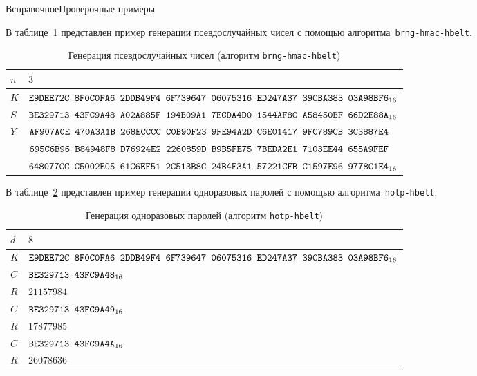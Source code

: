 \begin{appendix}{В}{справочное}{Проверочные примеры}

В таблице~\ref{Table.PRNG-HMAC} представлен пример 
генерации псевдослучайных чисел 
с помощью алгоритма~\texttt{brng-hmac-hbelt}.

\begin{table}[H]
\caption{Генерация псевдослучайных чисел (алгоритм \texttt{brng-hmac-hbelt})}
\label{Table.PRNG-HMAC}
\begin{tabular}{|l|l|}
%
\hline
$n$ & 
$3$\\
%
\hline
$K$ & 
$\texttt{E9DEE72C~8F0C0FA6~2DDB49F4~6F739647~06075316~ED247A37~39CBA383~03A98BF6}_{16}$\\
%
\hline
$S$ & 
$\texttt{BE329713~43FC9A48~A02A885F~194B09A1~7ECDA4D0~1544AF8C~A58450BF~66D2E88A}_{16}$\\
\hline
\hline
$Y$ & 
$\texttt{AF907A0E~470A3A1B~268ECCCC~C0B90F23~9FE94A2D~C6E01417~9FC789CB~3C3887E4}$\\
&
$\texttt{695C6B96~B84948F8~D76924E2~2260859D~B9B5FE75~7BEDA2E1~7103EE44~655A9FEF}$\\
&
$\texttt{648077CC~C5002E05~61C6EF51~2C513B8C~24B4F3A1~57221CFB~C1597E96~9778C1E4}_{16}$\\
\hline
\end{tabular}
\end{table}


В таблице~\ref{Table.HOTP} представлен пример 
генерации одноразовых паролей 
с помощью алгоритма~\texttt{hotp-hbelt}.

\begin{table}[H]
\caption{Генерация одноразовых паролей (алгоритм \texttt{hotp-hbelt})}
\label{Table.HOTP}
\begin{tabular}{|l|l|}
%
\hline
$d$ & 
$8$\\
%
\hline
$K$ & 
$\texttt{E9DEE72C~8F0C0FA6~2DDB49F4~6F739647~06075316~ED247A37~39CBA383~03A98BF6}_{16}$\\
%
\hline
\hline
$C$ & 
$\texttt{BE329713~43FC9A48}_{16}$\\
\hline
$R$ & 
$21157984$\\
\hline
\hline
$C$ & 
$\texttt{BE329713~43FC9A49}_{16}$\\
\hline
$R$ & 
$17877985$\\
\hline
\hline
$C$ & 
$\texttt{BE329713~43FC9A4A}_{16}$\\
\hline
$R$ & 
$26078636$\\
\hline
\end{tabular}
\end{table}



\end{appendix}
